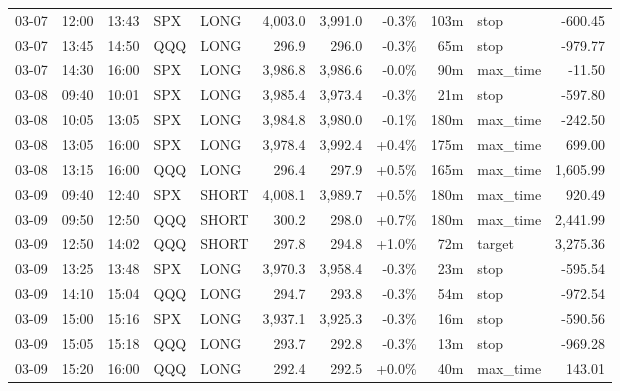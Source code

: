 \documentclass[11pt,a4paper,twoside]{article}
\begin{document}
\begin{center}
\begin{longtable}{>{\color{txtmain}}l l l l l r r r r >{\color{txtmain}}l r}
03-07 & 12:00 & 13:43 & SPX & LONG & 4,003.0 & 3,991.0 & \textcolor{lossred}{-0.3\%} & 103m & stop & \textcolor{lossred}{-600.45} \\
03-07 & 13:45 & 14:50 & QQQ & LONG & 296.9 & 296.0 & \textcolor{lossred}{-0.3\%} & 65m & stop & \textcolor{lossred}{-979.77} \\
03-07 & 14:30 & 16:00 & SPX & LONG & 3,986.8 & 3,986.6 & \textcolor{lossred}{-0.0\%} & 90m & max\_time & \textcolor{lossred}{-11.50} \\
03-08 & 09:40 & 10:01 & SPX & LONG & 3,985.4 & 3,973.4 & \textcolor{lossred}{-0.3\%} & 21m & stop & \textcolor{lossred}{-597.80} \\
03-08 & 10:05 & 13:05 & SPX & LONG & 3,984.8 & 3,980.0 & \textcolor{lossred}{-0.1\%} & 180m & max\_time & \textcolor{lossred}{-242.50} \\
03-08 & 13:05 & 16:00 & SPX & LONG & 3,978.4 & 3,992.4 & \textcolor{wingreen}{+0.4\%} & 175m & max\_time & \textcolor{wingreen}{699.00} \\
03-08 & 13:15 & 16:00 & QQQ & LONG & 296.4 & 297.9 & \textcolor{wingreen}{+0.5\%} & 165m & max\_time & \textcolor{wingreen}{1,605.99} \\
03-09 & 09:40 & 12:40 & SPX & SHORT & 4,008.1 & 3,989.7 & \textcolor{wingreen}{+0.5\%} & 180m & max\_time & \textcolor{wingreen}{920.49} \\
03-09 & 09:50 & 12:50 & QQQ & SHORT & 300.2 & 298.0 & \textcolor{wingreen}{+0.7\%} & 180m & max\_time & \textcolor{wingreen}{2,441.99} \\
03-09 & 12:50 & 14:02 & QQQ & SHORT & 297.8 & 294.8 & \textcolor{wingreen}{+1.0\%} & 72m & target & \textcolor{wingreen}{3,275.36} \\
03-09 & 13:25 & 13:48 & SPX & LONG & 3,970.3 & 3,958.4 & \textcolor{lossred}{-0.3\%} & 23m & stop & \textcolor{lossred}{-595.54} \\
03-09 & 14:10 & 15:04 & QQQ & LONG & 294.7 & 293.8 & \textcolor{lossred}{-0.3\%} & 54m & stop & \textcolor{lossred}{-972.54} \\
03-09 & 15:00 & 15:16 & SPX & LONG & 3,937.1 & 3,925.3 & \textcolor{lossred}{-0.3\%} & 16m & stop & \textcolor{lossred}{-590.56} \\
03-09 & 15:05 & 15:18 & QQQ & LONG & 293.7 & 292.8 & \textcolor{lossred}{-0.3\%} & 13m & stop & \textcolor{lossred}{-969.28} \\
03-09 & 15:20 & 16:00 & QQQ & LONG & 292.4 & 292.5 & \textcolor{wingreen}{+0.0\%} & 40m & max\_time & \textcolor{wingreen}{143.01} \\

\end{longtable}
\end{center}
\end{document}
